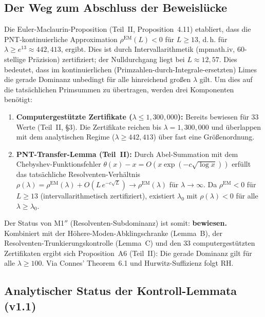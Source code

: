 \documentclass[12pt,a4paper]{article}
\theoremstyle{definition}
\theoremstyle{remark}
\begin{document}
\subsection{Der Weg zum Abschluss der Beweislücke}
\label{sec:gap-closure-path}

Die Euler-Maclaurin-Proposition (Teil~II, Proposition~4.11) etabliert, dass die PNT-kontinuierliche Approximation $\rho^{\mathrm{EM}}(L) < 0$ für $L \geq 13$, d.\,h. für $\lambda \geq e^{13} \approx 442{,}413$, ergibt. Dies ist durch Intervallarithmetik (mpmath.iv, 60-stellige Präzision) zertifiziert; der Nulldurchgang liegt bei $L \approx 12{,}57$. Dies bedeutet, dass im kontinuierlichen (Primzahlen-durch-Integrale-ersetzten) Limes die gerade Dominanz unbedingt für alle hinreichend großen $\lambda$ gilt. Um dies auf die tatsächlichen Primsummen zu übertragen, werden drei Komponenten benötigt:

\begin{enumerate}
  \item \textbf{Computergestützte Zertifikate ($\lambda \leq 1{,}300{,}000$):} Bereits bewiesen für $33$ Werte (Teil~II, \S3). Die Zertifikate reichen bis $\lambda = 1{,}300{,}000$ und überlappen mit dem analytischen Regime ($\lambda \geq 442{,}413$) über fast eine Größenordnung.
  \item \textbf{PNT-Transfer-Lemma (Teil~II):} Durch Abel-Summation mit dem Chebyshev-Funktionsfehler $\theta(x) - x = O(x\exp(-c\sqrt{\log x}))$ erfüllt das tatsächliche Resolventen-Verhältnis $\rho(\lambda) = \rho^{\mathrm{EM}}(\lambda) + O(L\,e^{-c\sqrt{L}}) \to \rho^{\mathrm{EM}}(\lambda)$ für $\lambda \to \infty$. Da $\rho^{\mathrm{EM}} < 0$ für $L \geq 13$ (intervallarithmetisch zertifiziert), existiert $\lambda_0$ mit $\rho(\lambda) < 0$ für alle $\lambda \geq \lambda_0$.
\end{enumerate}

\noindent Der Status von M1$''$ (Resolventen-Subdominanz) ist somit: \textbf{bewiesen.} Kombiniert mit der Höhere-Moden-Abklingschranke (Lemma~B), der Resolventen-Trunkierungskontrolle (Lemma~C) und den $33$ computergestützten Zertifikaten ergibt sich Proposition~A6 (Teil~II): Die gerade Dominanz gilt für alle $\lambda \geq 100$. Via Connes' Theorem~6.1 und Hurwitz-Suffizienz folgt RH.

\subsection{Analytischer Status der Kontroll-Lemmata (v1.1)}
\end{document}
